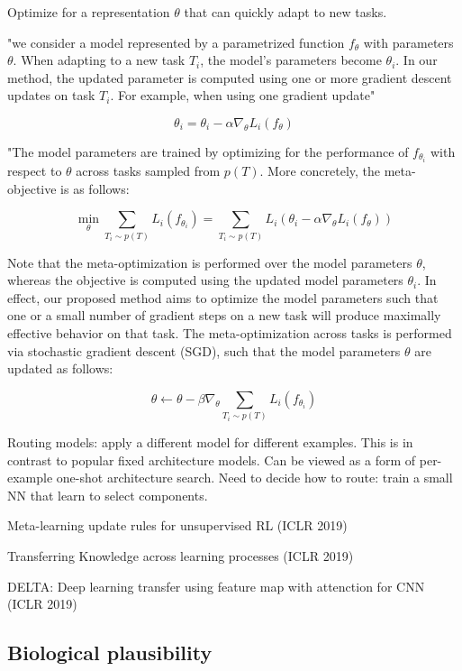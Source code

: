 \documentclass[english]{article}
\begin{document}
Optimize for a representation $\theta$ that can
quickly adapt to new tasks.

"we consider a model represented by a parametrized function $f_\theta$ with parameters $\theta$. When adapting to a new task $T_i$, the model's parameters become $\theta_i$. In our method, the updated parameter is computed using one or more gradient descent updates on task $T_i$. For
example, when using one gradient update"

$$\theta_i = \theta_i - \alpha \nabla_\theta L_i(f_\theta)$$

"The model parameters are trained by optimizing for the performance of $f_{\theta_i}$  with respect to $\theta$ across tasks sampled from $p(T)$. More concretely, the meta-objective is as follows:

$$\min_\theta 
\sum_{T_i \sim p(T)} L_i(f_{\theta_i}) 
= 
\sum_{T_i \sim p(T)} L_i(\theta_i - \alpha \nabla_\theta L_i(f_\theta)) 
$$


Note that the meta-optimization is performed over the
model parameters $\theta$, whereas the objective is computed using the updated model parameters $\theta_i$. In effect, our proposed method aims to optimize the model parameters such
that one or a small number of gradient steps on a new task
will produce maximally effective behavior on that task.
The meta-optimization across tasks is performed via
stochastic gradient descent (SGD), such that the model parameters $\theta$ are updated as follows:

$$\theta  \gets 
\theta - \beta \nabla_\theta \sum_{T_i \sim p(T)} L_i(f_{\theta_i})
$$

\item Routing models: apply a different model for different examples. This is in contrast to popular fixed architecture models. Can be viewed as a form of per-example one-shot architecture search. Need to decide how to route: train a small NN that learn to select components. 

\item Meta-learning update rules for unsupervised RL (ICLR 2019)

Transferring Knowledge across learning processes (ICLR 2019)

DELTA: Deep learning transfer using feature map with attenction for CNN (ICLR 2019)


\eenum 



\subsection{Biological plausibility}
\end{document}
